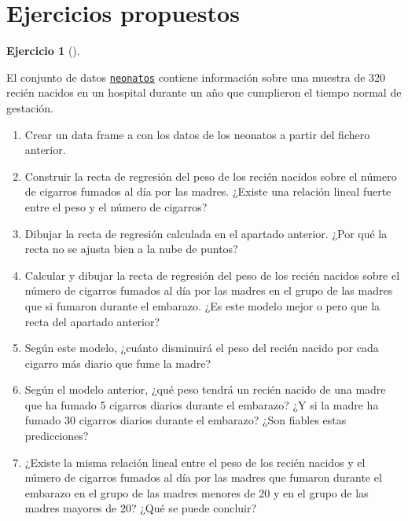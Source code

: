 \documentclass[
  a4paper,
]{scrreport}
\theoremstyle{definition}
\newtheorem{exercise}{Ejercicio}[chapter]
\theoremstyle{remark}
\begin{document}
\section{Ejercicios propuestos}\label{ejercicios-propuestos-4}

\begin{exercise}[]\protect\hypertarget{exr-regresion-6}{}\label{exr-regresion-6}

El conjunto de datos
\href{https://aprendeconalf.es/estadistica-practicas-r/datos/neonatos.csv}{\texttt{neonatos}}
contiene información sobre una muestra de 320 recién nacidos en un
hospital durante un año que cumplieron el tiempo normal de gestación.

\begin{enumerate}
\def\labelenumi{\alph{enumi}.}
\item
  Crear un data frame a con los datos de los neonatos a partir del
  fichero anterior.
\item
  Construir la recta de regresión del peso de los recién nacidos sobre
  el número de cigarros fumados al día por las madres. ¿Existe una
  relación lineal fuerte entre el peso y el número de cigarros?
\item
  Dibujar la recta de regresión calculada en el apartado anterior. ¿Por
  qué la recta no se ajusta bien a la nube de puntos?
\item
  Calcular y dibujar la recta de regresión del peso de los recién
  nacidos sobre el número de cigarros fumados al día por las madres en
  el grupo de las madres que si fumaron durante el embarazo. ¿Es este
  modelo mejor o pero que la recta del apartado anterior?
\item
  Según este modelo, ¿cuánto disminuirá el peso del recién nacido por
  cada cigarro más diario que fume la madre?
\item
  Según el modelo anterior, ¿qué peso tendrá un recién nacido de una
  madre que ha fumado 5 cigarros diarios durante el embarazo? ¿Y si la
  madre ha fumado 30 cigarros diarios durante el embarazo? ¿Son fiables
  estas predicciones?
\item
  ¿Existe la misma relación lineal entre el peso de los recién nacidos y
  el número de cigarros fumados al día por las madres que fumaron
  durante el embarazo en el grupo de las madres menores de 20 y en el
  grupo de las madres mayores de 20? ¿Qué se puede concluir?
\end{enumerate}

\end{exercise}
\end{document}
